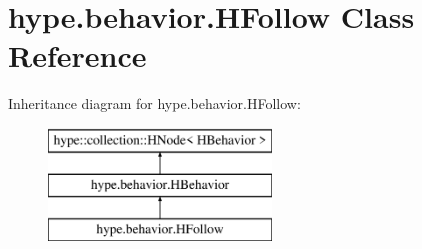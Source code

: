 \hypertarget{classhype_1_1behavior_1_1_h_follow}{\section{hype.\-behavior.\-H\-Follow Class Reference}
\label{classhype_1_1behavior_1_1_h_follow}
}
Inheritance diagram for hype.\-behavior.\-H\-Follow\-:\begin{figure}[H]
\begin{center}
\leavevmode
\includegraphics[height=3.000000cm]{classhype_1_1behavior_1_1_h_follow}
\end{center}
\end{figure}
